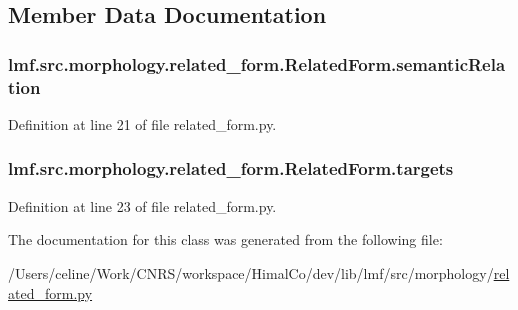 \subsection{Member Data Documentation}
\hypertarget{classlmf_1_1src_1_1morphology_1_1related__form_1_1_related_form_a55ef34c7db0320aede2a86eff3085d46}{
\subsubsection[{semantic\+Relation}]{\setlength{\rightskip}{0pt plus 5cm}lmf.\+src.\+morphology.\+related\+\_\+form.\+Related\+Form.\+semantic\+Relation}}\label{classlmf_1_1src_1_1morphology_1_1related__form_1_1_related_form_a55ef34c7db0320aede2a86eff3085d46}


Definition at line 21 of file related\+\_\+form.\+py.

\hypertarget{classlmf_1_1src_1_1morphology_1_1related__form_1_1_related_form_a6f5035848e99af2cb539ba660d5c15a3}{
\subsubsection[{targets}]{\setlength{\rightskip}{0pt plus 5cm}lmf.\+src.\+morphology.\+related\+\_\+form.\+Related\+Form.\+targets}}\label{classlmf_1_1src_1_1morphology_1_1related__form_1_1_related_form_a6f5035848e99af2cb539ba660d5c15a3}


Definition at line 23 of file related\+\_\+form.\+py.



The documentation for this class was generated from the following file\+:\begin{DoxyCompactItemize}
\item 
/\+Users/celine/\+Work/\+C\+N\+R\+S/workspace/\+Himal\+Co/dev/lib/lmf/src/morphology/\hyperlink{related__form_8py}{related\+\_\+form.\+py}\end{DoxyCompactItemize}
